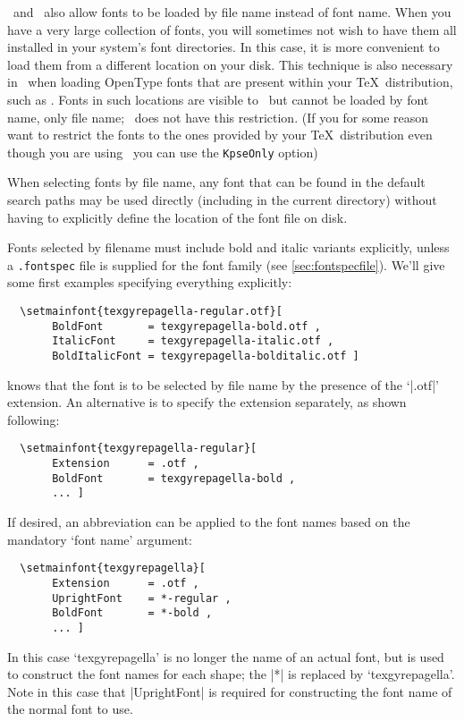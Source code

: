 \documentclass[a4paper]{l3doc}
\begin{document}
\XeTeX\ and \LuaTeX\ also allow fonts to be loaded by file name instead of font name.
When you have a very large collection of fonts, you will sometimes not
wish to have them all installed in your system's font directories.
In this case, it is more convenient to load them from a different location on your disk.
This technique is also necessary in \XeTeX\ when loading OpenType fonts that are present within your \TeX\ distribution, such as .
Fonts in such locations are visible to \XeTeX\ but cannot be loaded by font name, only file name; \LuaTeX\ does not have this restriction.
(If you for some reason want to restrict the fonts to the ones provided by your \TeX\ distribution even though you are using \LuaTeX\ you can use the \texttt{KpseOnly} option)

When selecting fonts by file name, any font that can be found in the default
search paths may be used directly (including in the current directory)
without having to explicitly define the location of the font file on disk.

Fonts selected by filename must include bold and italic variants explicitly,
unless a \texttt{.fontspec} file is supplied for the font family (see \ref{sec:fontspecfile}).
We'll give some first examples specifying everything explicitly:
\begin{Verbatim}
  \setmainfont{texgyrepagella-regular.otf}[
       BoldFont       = texgyrepagella-bold.otf ,
       ItalicFont     = texgyrepagella-italic.otf ,
       BoldItalicFont = texgyrepagella-bolditalic.otf ]
\end{Verbatim}
 knows that the font is to be selected by file name by the
presence of the `|.otf|' extension.
An alternative is to specify the extension separately, as shown following:
\begin{Verbatim}
  \setmainfont{texgyrepagella-regular}[
       Extension      = .otf ,
       BoldFont       = texgyrepagella-bold ,
       ... ]
\end{Verbatim}
If desired, an abbreviation can be applied to the font names based on the
mandatory `font name' argument:
\begin{Verbatim}
  \setmainfont{texgyrepagella}[
       Extension      = .otf ,
       UprightFont    = *-regular ,
       BoldFont       = *-bold ,
       ... ]
\end{Verbatim}
In this case `texgyrepagella' is no longer the name of an actual font,
but is used to construct the font names for each shape;
the |*| is replaced by `texgyrepagella'.
Note in this case that |UprightFont| is required for constructing the font
name of the normal font to use.
\end{document}
